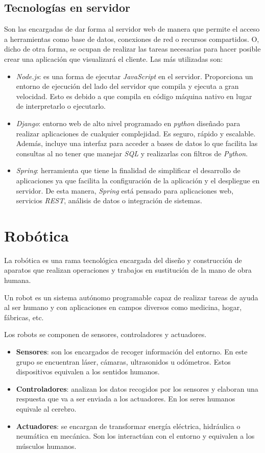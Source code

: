 \subsection{Tecnologías en servidor}
\label{subsec:tecserver}
Son las encargadas de dar forma al servidor web de manera que permite el acceso a herramientas como base de datos, conexiones de red o recursos compartidos. O, dicho de otra forma, se ocupan de realizar las tareas necesarias para hacer posible crear una aplicación que visualizará el cliente. Las más utilizadas son: 
\begin{itemize}
    \item \textit{Node.js}: es una forma de ejecutar \textit{JavaScript} en el servidor. Proporciona un entorno de ejecución del lado del servidor que compila y ejecuta a gran velocidad.  Esto es debido a que compila en código máquina nativo en lugar de interpretarlo o ejecutarlo.   
    \item \textit{Django}: entorno web de alto nivel programado en \textit{python} diseñado para realizar aplicaciones de cualquier complejidad. Es seguro, rápido y escalable. Además, incluye una interfaz para acceder a bases de datos lo que facilita las consultas al no tener que manejar \textit{SQL} y realizarlas con filtros de \textit{Python}.
    \item \textit{Spring}: herramienta que tiene la finalidad de simplificar el desarrollo de aplicaciones ya que facilita la configuración de la aplicación y el despliegue en servidor. De esta manera, \textit{Spring} está pensado para aplicaciones web, servicios \textit{REST}, análisis de datos o integración de sistemas. 
\end{itemize}

\section{Robótica}
\label{sec:robotica}
La robótica es una rama tecnológica encargada del diseño y construcción de aparatos que realizan operaciones y trabajos en sustitución de la mano de obra humana. 

Un robot es un sistema autónomo programable capaz de realizar tareas de ayuda al ser humano y con aplicaciones en campos diversos como medicina, hogar, fábricas, etc. 

Los robots se componen de sensores, controladores y actuadores.
\begin{itemize}
    \item \textbf{Sensores}: son los encargados de recoger información del entorno. En este grupo se encuentran láser, cámaras, ultrasonidos u odómetros. Estos dispositivos equivalen a los sentidos humanos. 
    \item \textbf{Controladores}: analizan los datos recogidos por los sensores y elaboran una respuesta que va a ser enviada a los actuadores. En los seres humanos equivale al cerebro. 
    \item \textbf{Actuadores}: se encargan de transformar energía eléctrica, hidráulica o neumática en mecánica. Son los interactúan con el entorno y equivalen a los músculos humanos. 
\end{itemize}

